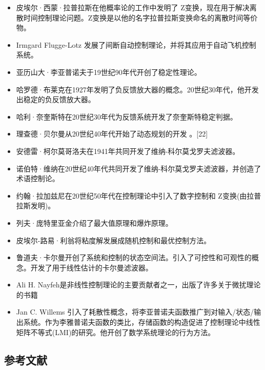 \begin{itemize}
\item 皮埃尔·西蒙·拉普拉斯在他概率论的工作中发明了 Z变换，现在用于解决离散时间控制理论问题。Z变换是以他的名字拉普拉斯变换命名的离散时间等价物。
\item Irmgard Flugge-Lotz 发展了间断自动控制理论，并将其应用于自动飞机控制系统。
\item 亚历山大·李亚普诺夫于19世纪90年代开创了稳定性理论。
\item 哈罗德·布莱克在1927年发明了负反馈放大器的概念。20世纪30年代，他开发出稳定的负反馈放大器。
\item 哈利·奈奎斯特在20世纪30年代为反馈系统开发了奈奎斯特稳定判据。
\item 理查德·贝尔曼从20世纪40年代开始了动态规划的开发 。[22]
\item 安德雷·柯尔莫哥洛夫在1941年共同开发了维纳-科尔莫戈罗夫滤波器。
\item 诺伯特·维纳在20世纪40年代共同开发了维纳-科尔莫戈罗夫滤波器，并创造了术语控制论。
\item 约翰·拉加兹尼在20世纪50年代在控制理论中引入了数字控制和 Z变换(由拉普拉斯发明)。
\item 列夫·庞特里亚金介绍了最大值原理和爆炸原理。
\item 皮埃尔-路易·利翁将粘度解发展成随机控制和最优控制方法。
\item 鲁道夫·卡尔曼开创了系统和控制的状态空间法。引入了可控性和可观性的概念。开发了用于线性估计的卡尔曼滤波器。
\item Ali H. Nayfeh是非线性控制理论的主要贡献者之一，出版了许多关于微扰理论的书籍
\item Jan C. Willems 引入了耗散性概念，将李亚普诺夫函数推广到对输入/状态/输出系统。作为李雅普诺夫函数的类比，存储函数的构造促进了控制理论中线性矩阵不等式(LMI)的研究。他开创了数学系统理论的行为方法。
\end{itemize}


\subsection{参考文献}

